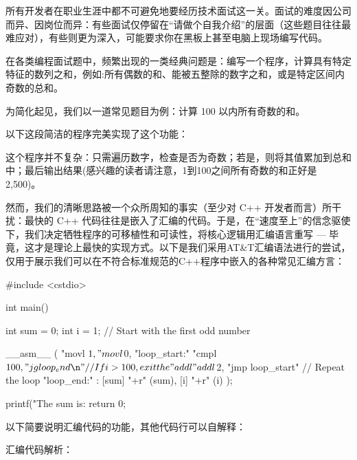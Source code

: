
所有开发者在职业生涯中都不可避免地要经历技术面试这一关。面试的难度因公司而异、因岗位而异：有些面试仅停留在“请做个自我介绍”的层面（这些题目往往最难应对），有些则更为深入，可能要求你在黑板上甚至电脑上现场编写代码。

在各类编程面试题中，频繁出现的一类经典问题是：编写一个程序，计算具有特定特征的数列之和，例如:所有偶数的和、能被五整除的数字之和，或是特定区间内奇数的总和。

为简化起见，我们以一道常见题目为例：计算 100 以内所有奇数的和。

以下这段简洁的程序完美实现了这个功能：


这个程序并不复杂：只需遍历数字，检查是否为奇数；若是，则将其值累加到总和中；最后输出结果(感兴趣的读者请注意，1到100之间所有奇数的和正好是2,500)。

然而，我们的清晰思路被一个众所周知的事实（至少对 C++ 开发者而言）所干扰：最快的 C++ 代码往往是嵌入了汇编的代码。于是，在“速度至上”的信念驱使下，我们决定牺牲程序的可移植性和可读性，将核心逻辑用汇编语言重写 --- 毕竟，这才是理论上最快的实现方式。以下是我们采用AT\&T汇编语法进行的尝试，仅用于展示我们可以在不符合标准规范的C++程序中嵌入的各种常见汇编方言：

\begin{cpp}
#include <cstdio>

int main() {
  int sum = 0;
  int i = 1; // Start with the first odd number
         
  __asm__ (
    "movl $1, %
    "movl $0, %
    "loop_start:\n"
    "cmpl $100, %
    "jg loop_end\n" // If i > 100, exit the
    "addl %
    "addl $2, %
    "jmp loop_start\n" // Repeat the loop
    "loop_end:\n"
    : [sum] "+r" (sum), [i] "+r" (i)
  );

  printf("The sum is: %
  return 0;
}
\end{cpp}

以下简要说明汇编代码的功能，其他代码行可以自解释：

汇编代码解析：

